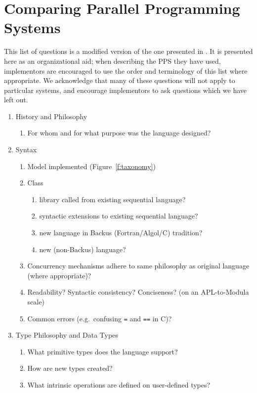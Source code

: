 \section{Comparing Parallel Programming Systems\label{s:questions}}

This list of questions is a modified version of the one presented in \cite{b:compare-ada-c-pascal}.
It is presented here as an organizational aid;
when describing the PPS they have used,
implementors are encouraged to use the order and terminology of this list where appropriate.
We acknowledge that many of these questions will not apply to particular systems,
and encourage implementors to ask questions which we have left out.

\begin{enumerate}
\item History and Philosophy
  \begin{enumerate}
  \item For whom and for what purpose was the language designed?
  \end{enumerate}
\item Syntax
  \begin{enumerate}
  \item Model implemented (Figure~\ref{f:taxonomy})
  \item Class
    \begin{enumerate}
    \item library called from existing sequential language?
    \item syntactic extensions to existing sequential language?
    \item new language in Backus (Fortran/Algol/C) tradition?
    \item new (non-Backus) language?
    \end{enumerate}
  \item Concurrency mechanisms adhere to same philosophy as original
	language (where appropriate)?
  \item Readability?  Syntactic consistency?  Conciseness?
	(on an APL-to-Modula scale)
  \item Common errors (e.g.\ confusing {\tt{=}} and {\tt{==}} in C)?
  \end{enumerate}
\item Type Philosophy and Data Types
  \begin{enumerate}
  \item What primitive types does the language support?
  \item How are new types created?
  \item What intrinsic operations are defined on user-defined types?

\end{enumerate}
\end{enumerate}
